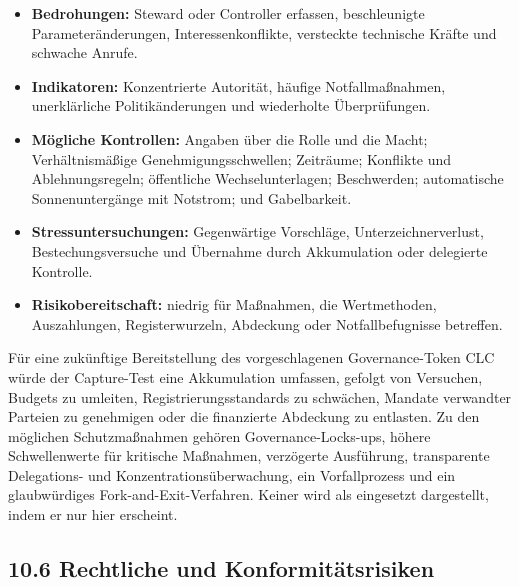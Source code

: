 \documentclass[11pt]{article}
\begin{document}
\begin{itemize}[leftmargin=*]
\item \textbf{Bedrohungen:} Steward oder Controller erfassen, beschleunigte Parameteränderungen, Interessenkonflikte, versteckte technische Kräfte und schwache Anrufe.
\item \textbf{Indikatoren:} Konzentrierte Autorität, häufige Notfallmaßnahmen, unerklärliche Politikänderungen und wiederholte Überprüfungen.
\item \textbf{Mögliche Kontrollen:} Angaben über die Rolle und die Macht; Verhältnismäßige Genehmigungsschwellen; Zeiträume; Konflikte und Ablehnungsregeln; öffentliche Wechselunterlagen; Beschwerden; automatische Sonnenuntergänge mit Notstrom; und Gabelbarkeit.
\item \textbf{Stressuntersuchungen:} Gegenwärtige Vorschläge, Unterzeichnerverlust, Bestechungsversuche und Übernahme durch Akkumulation oder delegierte Kontrolle.
\item \textbf{Risikobereitschaft:} niedrig für Maßnahmen, die Wertmethoden, Auszahlungen, Registerwurzeln, Abdeckung oder Notfallbefugnisse betreffen.
\end{itemize}
Für eine zukünftige Bereitstellung des vorgeschlagenen Governance-Token CLC würde der Capture-Test eine Akkumulation umfassen, gefolgt von Versuchen, Budgets zu umleiten, Registrierungsstandards zu schwächen, Mandate verwandter Parteien zu genehmigen oder die finanzierte Abdeckung zu entlasten. Zu den möglichen Schutzmaßnahmen gehören Governance-Locks-ups, höhere Schwellenwerte für kritische Maßnahmen, verzögerte Ausführung, transparente Delegations- und Konzentrationsüberwachung, ein Vorfallprozess und ein glaubwürdiges Fork-and-Exit-Verfahren. Keiner wird als eingesetzt dargestellt, indem er nur hier erscheint.

\subsection*{10.6 Rechtliche und Konformitätsrisiken}
\end{document}
